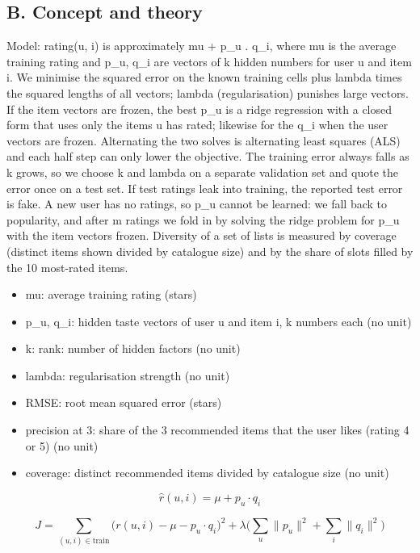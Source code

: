 \documentclass[11pt,a4paper]{article}
\begin{document}
\subsection*{B. Concept and theory}
Model: rating(u, i) is approximately mu + p\_u . q\_i, where mu is the average training rating and p\_u, q\_i are vectors of k hidden numbers for user u and item i. We minimise the squared error on the known training cells plus lambda times the squared lengths of all vectors; lambda (regularisation) punishes large vectors. If the item vectors are frozen, the best p\_u is a ridge regression with a closed form that uses only the items u has rated; likewise for the q\_i when the user vectors are frozen. Alternating the two solves is alternating least squares (ALS) and each half step can only lower the objective. The training error always falls as k grows, so we choose k and lambda on a separate validation set and quote the error once on a test set. If test ratings leak into training, the reported test error is fake. A new user has no ratings, so p\_u cannot be learned: we fall back to popularity, and after m ratings we fold in by solving the ridge problem for p\_u with the item vectors frozen. Diversity of a set of lists is measured by coverage (distinct items shown divided by catalogue size) and by the share of slots filled by the 10 most-rated items.

\begin{itemize}[nosep]
\item mu: average training rating (stars)
\item p\_u, q\_i: hidden taste vectors of user u and item i, k numbers each (no unit)
\item k: rank: number of hidden factors (no unit)
\item lambda: regularisation strength (no unit)
\item RMSE: root mean squared error (stars)
\item precision at 3: share of the 3 recommended items that the user likes (rating 4 or 5) (no unit)
\item coverage: distinct recommended items divided by catalogue size (no unit)
\end{itemize}

\begin{equation*}
\hat r(u,i)=\mu+p_u\cdot q_i
\end{equation*}

\begin{equation*}
J=\sum_{(u,i)\in\mathrm{train}}\big(r(u,i)-\mu-p_u\cdot q_i\big)^2+\lambda\Big(\sum_u\lVert p_u\rVert^2+\sum_i\lVert q_i\rVert^2\Big)
\end{equation*}
\end{document}
